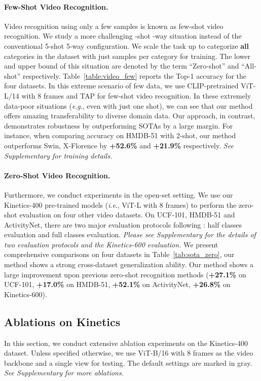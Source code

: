 \documentclass[letterpaper]{article} \usepackage{aaai23}  \usepackage{times}  \usepackage{helvet}  \usepackage{courier}  \usepackage[hyphens]{url}  \usepackage{graphicx} \urlstyle{rm} \def\UrlFont{\rm}  \usepackage{natbib}  \usepackage{caption} \frenchspacing  \setlength{\pdfpagewidth}{8.5in}  \setlength{\pdfpageheight}{11in}  \usepackage{algorithm}
\newcommand{\ie}{\textit{i}.\textit{e}.}
\newcommand{\eg}{\textit{e}.\textit{g}.}
\begin{document}
\paragraph{Few-Shot Video Recognition.}\label{exp:video_fewshot}
Video recognition using only a few samples is known as few-shot video recognition.
We study a more challenging -shot -way situation instead of the conventional 
5-shot 5-way configuration. 
We scale the task up to categorize \textbf{all} categories in the dataset with just  samples per category for training. 
The lower and upper bound of this situation are denoted by the term ``Zero-shot'' and ``All-shot'' respectively.
Table~\ref{table:video_few} reports the Top-1 accuracy for the four datasets.
In this extreme scenario of few data, we use CLIP-pretrained ViT-L/14 with 8 frames and TAP for few-shot video recognition.
In these extremely data-poor situations (\eg, even with just one shot), we can see that our method offers amazing transferability to diverse domain data.
Our approach, in contrast, demonstrates robustness by outperforming SOTAs by a large margin. For instance, when comparing accuracy on HMDB-51 with 2-shot, our method outperforms Swin, X-Florence by \textbf{+52.6\%} and \textbf{+21.9\%} respectively.
\emph{See Supplementary for training details.}

\paragraph{Zero-Shot Video Recognition.}\label{exp:zero_video}
Furthermore, we conduct experiments in the open-set setting. We use our Kinetics-400 pre-trained models (\ie, ViT-L with 8 frames) to perform the zero-shot evaluation on four other video datasets.
On UCF-101, HMDB-51 and ActivityNet, there are two major evaluation protocols following \cite{E2E}: half classes evaluation and full classes evaluation.
\emph{Please see Supplementary for the details of two evaluation protocols and the Kinetics-600 evaluation.}
We present comprehensive comparisons on four datasets in Table~\ref{tab:sota_zero}, our method shows a strong cross-dataset generalization ability.
Our method shows a large improvement upon previous zero-shot recognition methods (\textbf{+27.1\%} on UCF-101, \textbf{+17.0\%} on HMDB-51, \textbf{+52.1\%} on ActivityNet, \textbf{+26.8\%} on Kinetics-600). 





\subsection{Ablations on Kinetics}\label{ab:k400}
In this section, we conduct extensive ablation experiments on the Kinetics-400 dataset.
Unless specified otherwise, we use ViT-B/16 with 8 frames as the video backbone and a single view for testing. The default settings are marked in \colorbox{baselinecolor}{gray}.
\emph{See Supplementary for more ablations.}
\end{document}
